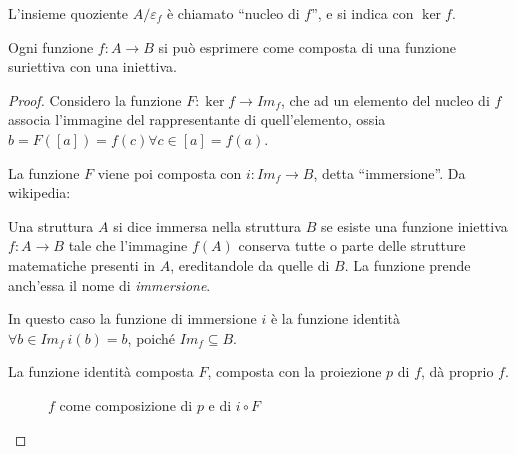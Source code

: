 \begin{defn}
L'insieme quoziente $A / \varepsilon_f$ \`e chiamato ``nucleo di $f$'', e si indica con $\ker f$.
\end{defn}

\begin{prop}
Ogni funzione $f : A \to B$ si pu\`o esprimere come composta di una funzione suriettiva con una iniettiva.
\end{prop}

\begin{proof}
Considero la funzione $F : \ker f \to Im_f$, che ad un elemento del nucleo di $f$ associa l'immagine del rappresentante di quell'elemento, ossia $b = F([a]) = f(c) \forall c \in [a] = f(a)$.

La funzione $F$ viene poi composta con $i : Im_f \to B $, detta ``immersione''. Da wikipedia:
\begin{defn}[Immersione]
Una struttura $A$  si dice immersa nella struttura $B$ se esiste una funzione iniettiva $f: A \to B$ tale che l'immagine $f(A)$ conserva tutte o parte delle strutture matematiche presenti in $A$, ereditandole da quelle di $B$. La funzione prende anch'essa il nome di \textit{immersione}.
\end{defn} 
In questo caso la funzione di immersione $i$ \`e la funzione identit\`a $ \forall b \in Im_f \ i(b) = b$, poich\'e $Im_f \subseteq B$.

La funzione identit\`a composta $F$, composta con la proiezione $p$ di $f$, d\`a proprio $f$.

\begin{figure}[ht]
\centering
{}
\caption{$f$ come composizione di $p$ e di $i \circ F$}
\end{figure}
\end{proof}


